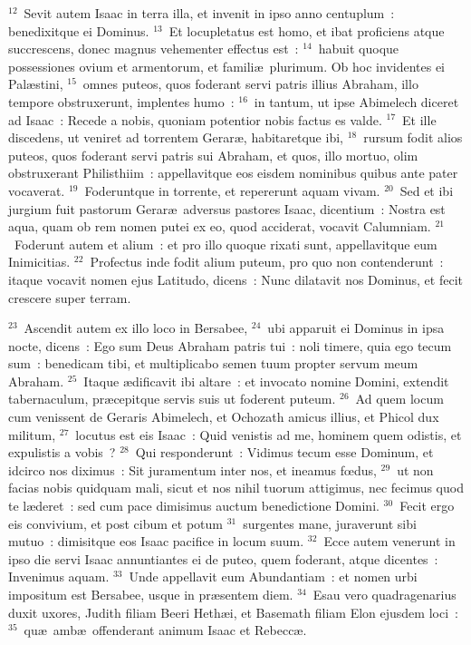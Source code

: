 ${}^{12}$~Sevit autem Isaac in terra illa, et invenit in ipso anno centuplum~: benedixitque ei Dominus.
${}^{13}$~Et locupletatus est homo, et ibat proficiens atque succrescens, donec magnus vehementer effectus est~:
${}^{14}$~habuit quoque possessiones ovium et armentorum, et famili\ae\ plurimum. Ob hoc invidentes ei Pal\ae stini,
${}^{15}$~omnes puteos, quos foderant servi patris illius Abraham, illo tempore obstruxerunt, implentes humo~:
${}^{16}$~in tantum, ut ipse Abimelech diceret ad Isaac~: Recede a nobis, quoniam potentior nobis factus es valde.
${}^{17}$~Et ille discedens, ut veniret ad torrentem Gerar\ae , habitaretque ibi,
${}^{18}$~rursum fodit alios puteos, quos foderant servi patris sui Abraham, et quos, illo mortuo, olim obstruxerant Philisthiim~: appellavitque eos eisdem nominibus quibus ante pater vocaverat.
${}^{19}$~Foderuntque in torrente, et repererunt aquam vivam.
${}^{20}$~Sed et ibi jurgium fuit pastorum Gerar\ae\ adversus pastores Isaac, dicentium~: Nostra est aqua, quam ob rem nomen putei ex eo, quod acciderat, vocavit Calumniam.
${}^{21}$~Foderunt autem et alium~: et pro illo quoque rixati sunt, appellavitque eum Inimicitias.
${}^{22}$~Profectus inde fodit alium puteum, pro quo non contenderunt~: itaque vocavit nomen ejus Latitudo, dicens~: Nunc dilatavit nos Dominus, et fecit crescere super terram.


${}^{23}$~Ascendit autem ex illo loco in Bersabee,
${}^{24}$~ubi apparuit ei Dominus in ipsa nocte, dicens~: Ego sum Deus Abraham patris tui~: noli timere, quia ego tecum sum~: benedicam tibi, et multiplicabo semen tuum propter servum meum Abraham.
${}^{25}$~Itaque \ae dificavit ibi altare~: et invocato nomine Domini, extendit tabernaculum, pr\ae cepitque servis suis ut foderent puteum.
${}^{26}$~Ad quem locum cum venissent de Geraris Abimelech, et Ochozath amicus illius, et Phicol dux militum,
${}^{27}$~locutus est eis Isaac~: Quid venistis ad me, hominem quem odistis, et expulistis a vobis~?
${}^{28}$~Qui responderunt~: Vidimus tecum esse Dominum, et idcirco nos diximus~: Sit juramentum inter nos, et ineamus fœdus,
${}^{29}$~ut non facias nobis quidquam mali, sicut et nos nihil tuorum attigimus, nec fecimus quod te l\ae deret~: sed cum pace dimisimus auctum benedictione Domini.
${}^{30}$~Fecit ergo eis convivium, et post cibum et potum
${}^{31}$~surgentes mane, juraverunt sibi mutuo~: dimisitque eos Isaac pacifice in locum suum.
${}^{32}$~Ecce autem venerunt in ipso die servi Isaac annuntiantes ei de puteo, quem foderant, atque dicentes~: Invenimus aquam.
${}^{33}$~Unde appellavit eum Abundantiam~: et nomen urbi impositum est Bersabee, usque in pr\ae sentem diem.
${}^{34}$~Esau vero quadragenarius duxit uxores, Judith filiam Beeri Heth\ae i, et Basemath filiam Elon ejusdem loci~:
${}^{35}$~qu\ae\ amb\ae\ offenderant animum Isaac et Rebecc\ae .

